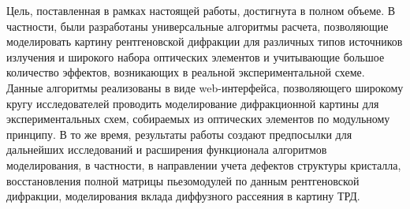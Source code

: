Цель, поставленная в рамках настоящей работы, достигнута в полном объеме.
В частности, были разработаны универсальные алгоритмы расчета,
позволяющие моделировать картину рентгеновской дифракции для различных типов
источников излучения и широкого набора оптических элементов и учитывающие большое
количество эффектов, возникающих в реальной экспериментальной схеме. Данные 
алгоритмы реализованы в виде web-интерфейса, позволяющего широкому кругу
исследователей проводить моделирование дифракционной картины для экспериментальных схем,
собираемых из оптических элементов по модульному принципу. В то же время,
 результаты работы создают предпосылки для дальнейших исследований и расширения
 функционала алгоритмов моделирования, в частности, в направлении учета дефектов
 структуры кристалла, восстановления полной матрицы пьезомодулей по данным
 рентгеновской дифракции, моделирования вклада диффузного рассеяния в картину ТРД.
